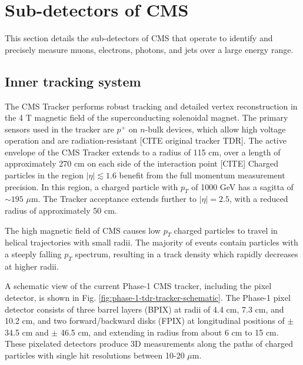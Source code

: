 \section{Sub-detectors of CMS}
This section details the sub-detectors of CMS that operate to identify and precisely measure muons, electrons, photons, and jets over a large energy range. 

\subsection{Inner tracking system}
The CMS Tracker performs robust tracking and detailed vertex reconstruction in the 4 T magnetic field of the superconducting solenoidal magnet. The primary sensors used in the tracker are $p^+$ on $n$-bulk devices, which allow high voltage operation and are radiation-resistant [CITE original tracker TDR]. The active envelope of the CMS Tracker extends to a radius of 115 cm, over a length of approximately 270 cm on each side of the interaction point [CITE] %
Charged particles in the region $|\eta| \lesssim 1.6$ benefit from the full momentum measurement precision. In this region, a charged particle with $p_T$ of 1000 GeV has a sagitta of $\sim 195$ $\mu$m. The Tracker acceptance extends further to $|\eta| = 2.5$, with a reduced radius of approximately 50 cm.

The high magnetic field of CMS causes low $p_{T}$ charged particles to travel in helical trajectories with small radii. The majority of events contain particles with a steeply falling $p_{T}$ spectrum, resulting in a track density which rapidly decreases at higher radii. 

A schematic view of the current Phase-1 CMS tracker, including the pixel detector, is shown in Fig. \ref{fig:phase-1-tdr-tracker-schematic}. The Phase-1 pixel detector consists of three barrel layers (BPIX) at radii of 4.4 cm, 7.3 cm, and 10.2 cm, and two forward/backward disks (FPIX) at longitudinal positions of $\pm$ 34.5 cm and $\pm$ 46.5 cm, and extending in radius from about 6 cm to 15 cm. These pixelated detectors produce 3D measurements along the paths of charged particles with single hit resolutions between 10-20 $\mu$m. 


